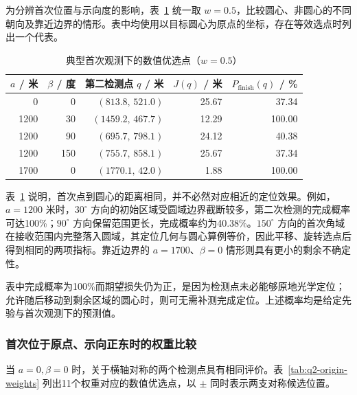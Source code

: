 为分辨首次位置与示向度的影响，表~\ref{tab:q2-typical-results} 统一取 \(w=0.5\)，比较圆心、非圆心的不同朝向及靠近边界的情形。表中均使用以目标圆心为原点的坐标，存在等效选点时列出一个代表。

\begin{table}[htbp]
  \centering
  \caption{典型首次观测下的数值优选点（\(w=0.5\)）}
  \label{tab:q2-typical-results}
  \small
  \renewcommand{\arraystretch}{1.08}
  \begin{tabular}{rrrrr}
    \toprule
    \(a\) / 米 & \(\beta\) / 度 & 第二检测点 \(q\) / 米 & \(J(q)\) / 米 & \(P_{\mathrm{finish}}(q)\) / \% \\
    \midrule
    0 & 0 & \((813.8,\,521.0)\) & 25.67 & 37.34 \\
    1200 & 30 & \((1459.2,\,467.7)\) & 12.29 & 100.00 \\
    1200 & 90 & \((695.7,\,798.1)\) & 24.12 & 40.38 \\
    1200 & 150 & \((755.7,\,858.1)\) & 25.67 & 37.34 \\
    1700 & 0 & \((1770.1,\,42.0)\) & 1.88 & 100.00 \\
    \bottomrule
  \end{tabular}
\end{table}

表~\ref{tab:q2-typical-results} 说明，首次点到圆心的距离相同，并不必然对应相近的定位效果。例如，\(a=1200\) 米时，\(30^\circ\) 方向的初始区域受圆域边界截断较多，第二次检测的完成概率可达100\%；\(90^\circ\) 方向保留范围更长，完成概率约为40.38\%。\(150^\circ\) 方向的首次角域在接收范围内完整落入圆域，其定位几何与圆心算例等价，因此平移、旋转选点后得到相同的两项指标。靠近边界的 \(a=1700\)、\(\beta=0\) 情形则具有更小的剩余不确定性。

表中完成概率为100\%而期望损失仍为正，是因为检测点未必能够原地光学定位；允许随后移动到剩余区域的圆心时，则可无需补测完成定位。上述概率均是给定先验与首次观测下的预测值。

\subsubsection{首次位于原点、示向正东时的权重比较}

当 \(a=0,\beta=0\) 时，关于横轴对称的两个检测点具有相同评价。表~\ref{tab:q2-origin-weights} 列出11个权重对应的数值优选点，以 \(\pm\) 同时表示两支对称候选位置。

